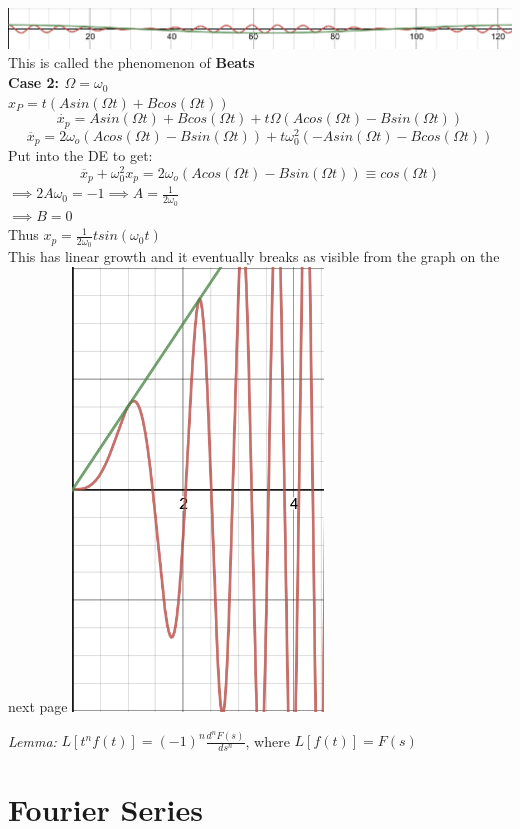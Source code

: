 \documentclass[11pt]{article}
\theoremstyle{definition}
\begin{document}
\begin{enumerate}[topsep=-10pt]
\includegraphics[width=\textwidth]{coscos.png}\\
This is called the phenomenon of \textbf{Beats}\\
\textbf{Case 2: $\Omega = \omega_0$}\\
$x_P = t(Asin(\Omega t) + Bcos(\Omega t))$
$$\dot{x_p} = Asin(\Omega t) + Bcos(\Omega t) + t\Omega(Acos(\Omega t) - Bsin(\Omega t))$$
$$\ddot{x_p} = 2\omega_o(Acos(\Omega t) - Bsin(\Omega t)) + t\omega_0^2(-Asin(\Omega t) - Bcos(\Omega t))$$
Put into the DE to get:
$$\ddot{x_p} + \omega_0^2x_p = 2\omega_o(Acos(\Omega t) - Bsin(\Omega t)) \equiv cos(\Omega t)$$
$\implies 2A\omega_0 = -1 \implies A = \frac{1}{2\omega_0}$\\
$\implies B = 0$\\
Thus $x_p = \frac{1}{2\omega_0}tsin(\omega_0 t)$\\
This has linear growth and it eventually breaks as visible from the graph on the next page
\includegraphics[width=0.5\textwidth]{resonance.png}
\end{enumerate}
\newpage


\textit{Lemma:} $L[t^nf(t)] = (-1)^n\frac{d^nF(s)}{ds^n}$, where $L[f(t)] = F(s)$

\newpage
\section{Fourier Series}
\end{document}

